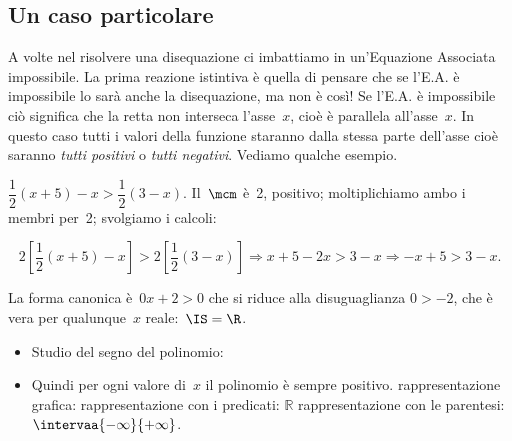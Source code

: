 \subsection{Un caso particolare}

A volte nel risolvere una disequazione ci imbattiamo in un'Equazione 
Associata impossibile. 
La prima reazione istintiva è quella di pensare che se l'E.A. è 
impossibile lo sarà anche la disequazione, ma non è così! 
Se l'E.A. è impossibile ciò significa che la retta non interseca 
l'asse~\(x\), cioè è parallela all'asse~\(x\). 
In questo caso tutti i valori della funzione staranno dalla stessa parte 
dell'asse cioè saranno \emph{tutti positivi} o \emph{tutti negativi}. 
Vediamo qualche esempio.

\begin{esempio}{}{}
\(\dfrac{1}{2} (x+5)-x>\dfrac{1}{2} (3-x).\)
Il~\(\mcm\) è~2, positivo; moltiplichiamo ambo i membri per~2; svolgiamo
i calcoli:

\vspace{-1.5em}
\[2 \left[\frac{1}{2}(x+5)-x\right]>2
\left[\frac{1}{2}(3-x)\right]\Rightarrow x+5-2x>3-x\Rightarrow -x+5>3-x.\]

La forma canonica è~\(0 x + 2 > 0\) che si riduce alla disuguaglianza 
\(0>-2\), che è vera per qualunque~\(x\) reale:~\(\IS=\R\).
\begin{itemize} [noitemsep, left=0mm]
 \item Studio del segno del polinomio:\\
\hspace*{-5mm} 
\item Quindi per ogni valore di~\(x\) il polinomio è sempre positivo. 
\subitem rappresentazione grafica: 
\subitem rappresentazione con i predicati: \quad \(\mathbb{R}\) 
\subitem rappresentazione con le parentesi: 
\quad \(\intervaa{-\infty}{+\infty}\). 
\end{itemize}
\end{esempio}


